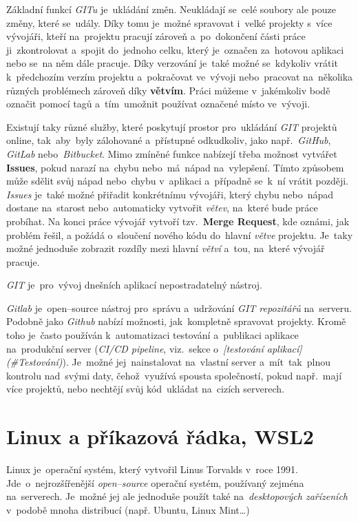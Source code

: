 \documentclass[11pt,a4paper]{report}
\begin{document}
            Základní funkcí \emph{GITu} je~ukládání změn. Neukládají se~celé soubory ale pouze změny, které se~udály. Díky tomu je~možné spravovat i~velké projekty s~více vývojáři, kteří na~projektu pracují zároveň a~po~dokončení části práce ji~zkontrolovat a~spojit do~jednoho celku, který je~označen za~hotovou aplikaci nebo se~na něm dále pracuje. Díky verzování je~také možné se~kdykoliv vrátit k~předchozím verzím projektu a~pokračovat ve~vývoji nebo~pracovat na~několika různých problémech zároveň díky \textbf{větvím}. Práci můžeme v~jakémkoliv bodě označit pomocí tagů a~tím~umožnit používat označené místo ve~vývoji.

            Existují taky různé služby, které poskytují prostor pro~ukládání \emph{GIT} projektů online, tak~aby~byly zálohované a~přístupné odkudkoliv, jako např.~\emph{GitHub}, \emph{GitLab} nebo~\emph{Bitbucket}. Mimo zmíněné funkce nabízejí třeba možnost vytvářet \textbf{Issues}, pokud narazí na~chybu nebo~má~nápad na~vylepšení. Tímto způsobem může sdělit svůj nápad nebo~chybu v~aplikaci a~případně se~k~ní vrátit později. \emph{Issues} je~také možné přiřadit konkrétnímu vývojáři, který chybu nebo~nápad dostane na~starost nebo~automaticky vytvořit \emph{větev}, na~které bude práce probíhat. Na konci práce vývojář vytvoří tzv.~\textbf{Merge Request}, kde oznámi, jak problém řešil, a požádá o~sloučení nového kódu do~hlavní \emph{větve} projektu. Je~taky možné jednoduše zobrazit rozdíly mezi hlavní \emph{větví} a~tou, na~které vývojář pracuje.
            
            \emph{GIT} je~pro~vývoj dnešních aplikací nepostradatelný nástroj. \cite{gitscmBook}
            
            \emph{Gitlab} je~open--source nástroj pro~správu a~udržování \emph{GIT repozitářů} na~serveru. Podobně jako \emph{Github} nabízí možnosti, jak~kompletně spravovat projekty. Kromě toho je~často používán k~automatizaci testování a~publikaci aplikace na~produkční server (\emph{CI/CD pipeline}, viz.~sekce o~\emph{[testování aplikací](#Testování)}). Je~možné jej~nainstalovat na~vlastní server a~mít~tak~plnou kontrolu nad~svými daty, čehož~využívá spousta společností, pokud např.~mají více projektů, nebo nechtějí svůj kód~ukládat na~cizích serverech. \cite{geerlings2022gitlab, gitlab:CICD, gitlab:actions}

        \section{Linux a příkazová řádka, WSL2}
            Linux je~operační systém, který vytvořil Linus Torvalds v~roce 1991. Jde~o~nejrozšířenější \emph{open--source} operační systém, používaný zejména na~serverech. Je~možné jej ale jednoduše použít také na~\emph{desktopových zařízeních} v~podobě mnoha distribucí (např. Ubuntu, Linux Mint\dots)
            
\end{document}
